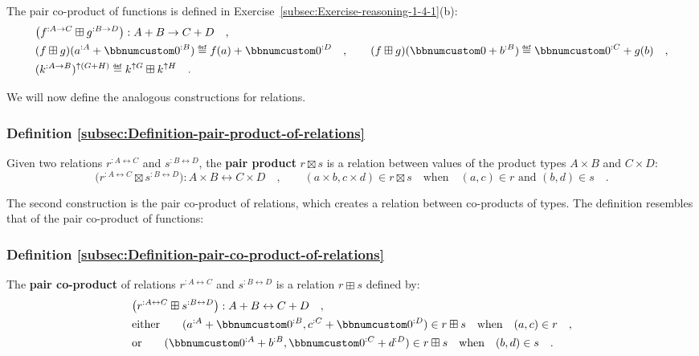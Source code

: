 The pair co-product of functions
is defined in Exercise~\ref{subsec:Exercise-reasoning-1-4-1}(b):
\begin{align*}
 & \big(f^{:A\rightarrow C}\boxplus g^{:B\rightarrow D}\big):A+B\rightarrow C+D\quad,\\
 & (f\boxplus g)(a^{:A}+\bbnum 0^{:B})\triangleq f(a)+\bbnum 0^{:D}\quad,\quad\quad(f\boxplus g)(\bbnum 0+b^{:B})\triangleq\bbnum 0^{:C}+g(b)\quad,\\
 & (k^{:A\rightarrow B})^{\uparrow(G+H)}\triangleq k^{\uparrow G}\boxplus k^{\uparrow H}\quad.
\end{align*}

We will now define the analogous constructions for relations.

\subsubsection{Definition \label{subsec:Definition-pair-product-of-relations}\ref{subsec:Definition-pair-product-of-relations}}

Given two relations $r^{:A\leftrightarrow C}$ and $s^{:B\leftrightarrow D}$,
the \textbf{pair product}  $r\boxtimes s$
is a relation between values of the product types $A\times B$ and
$C\times D$:
\[
\big(r^{:A\leftrightarrow C}\boxtimes s^{:B\leftrightarrow D}\big):A\times B\leftrightarrow C\times D\quad,\quad\quad(a\times b,c\times d)\in r\boxtimes s\quad\text{when}\quad(a,c)\in r\text{ and }(b,d)\in s\quad.
\]

The second construction is the pair co-product of relations,
which creates a relation between co-products of types. The definition
resembles that of the pair co-product
of functions:

\subsubsection{Definition \label{subsec:Definition-pair-co-product-of-relations}\ref{subsec:Definition-pair-co-product-of-relations}}

The \textbf{pair co-product} of relations $r^{:A\leftrightarrow C}$
and $s^{:B\leftrightarrow D}$ is a relation $r\boxplus s$ defined
by:
\begin{align*}
 & \big(r^{:A\leftrightarrow C}\boxplus s^{:B\leftrightarrow D}\big):A+B\leftrightarrow C+D\quad,\\
 & \text{either}\quad\quad(a^{:A}+\bbnum 0^{:B},c^{:C}+\bbnum 0^{:D})\in r\boxplus s\quad\text{when}\quad(a,c)\in r\quad,\\
 & \text{or}\quad\quad(\bbnum 0^{:A}+b^{:B},\bbnum 0^{:C}+d^{:D})\in r\boxplus s\quad\text{when}\quad(b,d)\in s\quad.
\end{align*}

